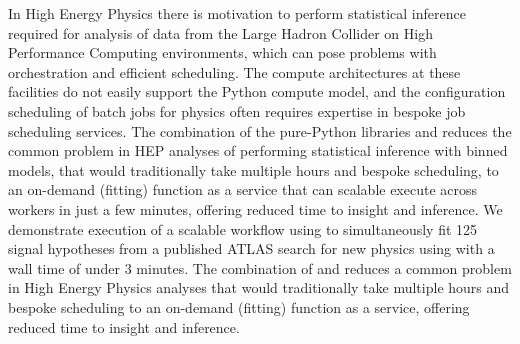 In High Energy Physics there is motivation to perform statistical inference required for analysis of data from the Large Hadron Collider on High Performance Computing environments, which can pose problems with orchestration and efficient scheduling.
The compute architectures at these facilities do not easily support the Python compute model, and the configuration scheduling of batch jobs for physics often requires expertise in bespoke job scheduling services.
The combination of the pure-Python libraries \pyhf{} and \funcX{} reduces the common problem in HEP analyses of performing statistical inference with binned models, that would traditionally take multiple hours and bespoke scheduling, to an on-demand (fitting) function as a service that can scalable execute across workers in just a few minutes, offering reduced time to insight and inference.
We demonstrate execution of a scalable workflow using \funcX{} to simultaneously fit 125 signal hypotheses from a published ATLAS search for new physics using \pyhf{} with a wall time of under 3 minutes.
The combination of \pyhf{} and \funcX{} reduces a common problem in High Energy Physics analyses that would traditionally take multiple hours and bespoke scheduling to an on-demand (fitting) function as a service, offering reduced time to insight and inference.
